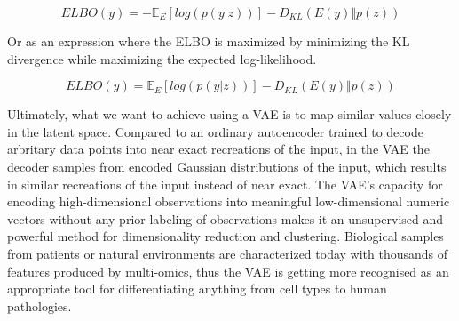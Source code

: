 \begin{equation}
ELBO(y) = -\mathbb{E}_{E}[log(p(y|z))] - D_{KL}(E(y) \Vert p(z))
\end{equation}

\noindent
Or as an expression where the ELBO is maximized by minimizing the KL divergence while maximizing the expected log-likelihood.

\begin{equation}
ELBO(y) = \mathbb{E}_{E}[log(p(y|z))] - D_{KL}(E(y) \Vert p(z))
\end{equation}

\noindent
Ultimately, what we want to achieve using a VAE is to map similar values closely in the latent space. Compared to an ordinary autoencoder trained to decode arbritary data points into near exact recreations of the input, in the VAE the decoder samples from encoded Gaussian distributions of the input, which results in similar recreations of the input instead of near exact. The VAE’s capacity for encoding high-dimensional observations into meaningful low-dimensional numeric vectors without any prior labeling of observations makes it an unsupervised and powerful method for dimensionality reduction and clustering. Biological samples from patients or natural environments are characterized today with thousands of features produced by multi-omics, thus the VAE is getting more recognised as an appropriate tool for differentiating anything from cell types to human pathologies.  
